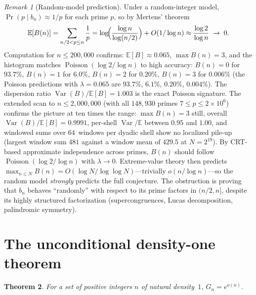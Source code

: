\documentclass[11pt]{article}
\newtheorem{theorem}{Theorem}
\theoremstyle{definition}
\theoremstyle{remark}
\newtheorem{remark}[theorem]{Remark}
\begin{document}
\begin{remark}[Random-model prediction]\label{rem:random}
Under a random-integer model, $\Pr(p \mid b_n) \approx 1/p$
for each prime $p$, so by Mertens' theorem
\[
\mathbb{E}[B(n)] = \sum_{n/2 < p \le n} \frac{1}{p}
= \log\!\Bigl(\frac{\log n}{\log(n/2)}\Bigr) + O(1/\log n)
\approx \frac{\log 2}{\log n} \;\to\; 0.
\]
Computation for $n \le 200{,}000$ confirms:
$\mathbb{E}[B] \approx 0.065$, $\max B(n) = 3$,
and the histogram matches
$\operatorname{Poisson}(\log 2/\log n)$ to high accuracy:
$B(n) = 0$ for $93.7\%$, $B(n) = 1$ for $6.0\%$,
$B(n) = 2$ for $0.20\%$, $B(n) = 3$ for $0.006\%$
(the Poisson predictions with $\lambda = 0.065$ are
$93.7\%$, $6.1\%$, $0.20\%$, $0.004\%$).
The dispersion ratio
$\operatorname{Var}(B)/\mathbb{E}[B] = 1.003$
is the exact Poisson signature.
The extended scan to $n \le 2{,}000{,}000$
(with all $148{,}930$ primes $7 \le p \le 2 \times 10^6$)
confirms the picture at ten times the range:
$\max B(n) = 3$ still, overall
$\operatorname{Var}(B)/\mathbb{E}[B] = 0.9991$,
per-shell $\operatorname{Var}/\mathbb{E}$ between
$0.95$ and $1.00$, and windowed sums over
$64$~windows per dyadic shell show no localized
pile-up (largest window sum $481$ against a
window mean of $429.5$ at $N = 2^{19}$).
By CRT-based approximate independence across primes,
$B(n)$ should follow $\operatorname{Poisson}(\log 2/\log n)$
with $\lambda \to 0$.
Extreme-value theory then predicts
$\max_{n \le N} B(n) = O(\log N/\log\log N)$---trivially
$o(n/\log n)$---so the random model \emph{strongly} predicts
the full conjecture.
The obstruction is proving that $b_n$ behaves
``randomly'' with respect to its prime factors in $(n/2, n]$,
despite its highly structured factorization
(supercongruences, Lucas decomposition,
palindromic symmetry).
\end{remark}

\section{The unconditional density-one theorem}\label{sec:density1}

\begin{theorem}\label{thm:density1}
For a set of positive integers $n$ of natural density~$1$,
$G_n = e^{o(n)}$.
\end{theorem}
\end{document}
